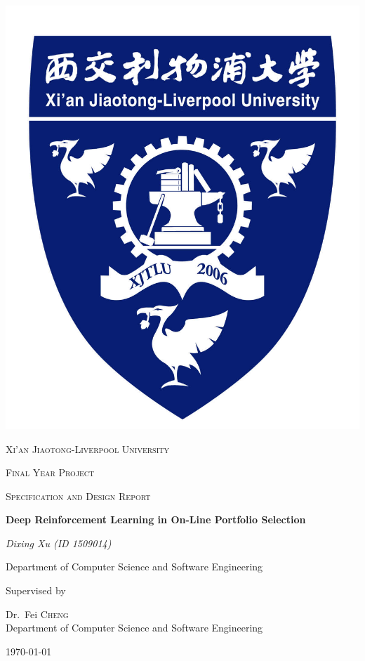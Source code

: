 \begin{titlepage}


\thispagestyle{empty}
\setlength\headheight{0pt} 
\begin{center}

\begin{center}
\includegraphics[width=0.25\linewidth]{img/xjtlu.jpg} 
\end{center}	

        \vspace{0.25cm}
        {\scshape\LARGE Xi'an Jiaotong-Liverpool University \par}
        \vspace{0.25cm}
        {\scshape\Large Final Year Project\par}
        {\scshape\Large Specification and Design Report \par}
        \vspace{0.5cm}

        {\Large\bfseries Deep Reinforcement Learning in On-Line Portfolio Selection\par}
        
        \vspace{0.5cm}
        {\Large\itshape Dixing Xu (ID 1509014)\par}
        Department of Computer Science and Software Engineering
        \vspace{0.25cm}

\vspace{1cm}
Supervised by\par
Dr.~Fei \textsc{Cheng} \\
Department of Computer Science and Software Engineering\par
\vspace{1.5cm}
\large
\today

\end{center}

\clearpage
\restoregeometry
\end{titlepage}
